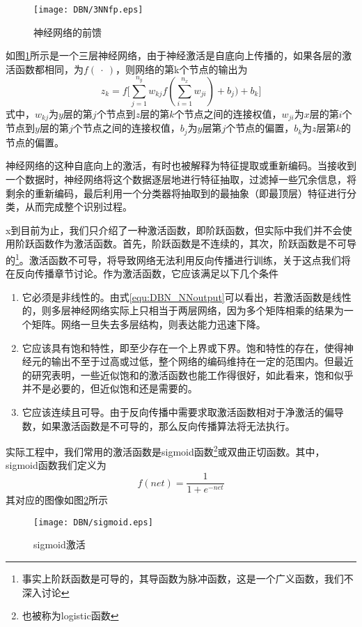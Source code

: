 \begin{figure}[!htbp]
\centering
\texttt{[image: DBN/3NNfp.eps]}
\caption{神经网络的前馈}
\label{img:3NNfp}
\end{figure}

如图\ref{img:3NNfp}所示是一个三层神经网络，由于神经激活是自底向上传播的，如果各层的激活函数都相同，为$f(~\cdot~)$，则网络的第k个节点的输出为
\begin{equation}
z_k = f\bigg[\sum\limits_{j=1}^{n_y} w_{kj} 
f(\sum\limits_{i=1}^{n_x} w_{ji}) + b_j)
+ b_k\bigg]
\label{equ:DBN_NNoutput}
\end{equation}
式中，$w_{kj} $为$y$层的第$j$个节点到$z$层的第$k$个节点之间的连接权值，$w_{ji} $为$x$层的第$i$个节点到$y$层的第$j$个节点之间的连接权值，$b_j$为$y$层第$j$个节点的偏置，$b_k$为$z$层第$k$的节点的偏置。

神经网络的这种自底向上的激活，有时也被解释为特征提取或重新编码。当接收到一个数据时，神经网络将这个数据逐层地进行特征抽取，过滤掉一些冗余信息，将剩余的重新编码，最后利用一个分类器将抽取到的最抽象（即最顶层）特征进行分类，从而完成整个识别过程。

x到目前为止，我们只介绍了一种激活函数，即阶跃函数，但实际中我们并不会使用阶跃函数作为激活函数。首先，阶跃函数是不连续的，其次，阶跃函数是不可导的\footnote{事实上阶跃函数是可导的，其导函数为脉冲函数，这是一个广义函数，我们不深入讨论}。激活函数不可导，将导致网络无法利用反向传播进行训练，关于这点我们将在反向传播章节讨论。作为激活函数，它应该满足以下几个条件
\begin{enumerate}
\item 它必须是非线性的。由式\eqref{equ:DBN_NNoutput}可以看出，若激活函数是线性的，则多层神经网络实际上只相当于两层网络，因为多个矩阵相乘的结果为一个矩阵。网络一旦失去多层结构，则表达能力迅速下降。
\item 它应该具有饱和特性，即至少存在一个上界或下界。饱和特性的存在，使得神经元的输出不至于过高或过低，整个网络的编码维持在一定的范围内。但最近的研究表明，一些近似饱和的激活函数也能工作得很好，如此看来，饱和似乎并不是必要的，但近似饱和还是需要的。
\item 它应该连续且可导。由于反向传播中需要求取激活函数相对于净激活的偏导数，如果激活函数是不可导的，那么反向传播算法将无法执行。
\end{enumerate}
实际工程中，我们常用的激活函数是sigmoid函数\footnote{也被称为logistic函数}或双曲正切函数。其中，sigmoid函数我们定义为
\begin{equation}
f(net) = \frac{1}{1+ e^{-net}}
\end{equation}
其对应的图像如图\ref{img:sigmoid}所示
\begin{figure}[!htbp]
\centering
\texttt{[image: DBN/sigmoid.eps]}
\caption{sigmoid激活}
\label{img:sigmoid}
\end{figure}

